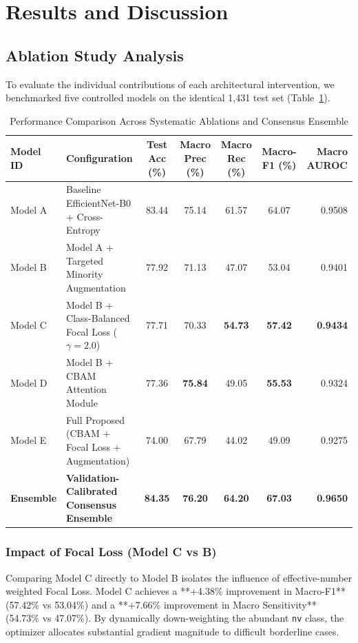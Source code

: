 \documentclass[conference]{IEEEtran}
\begin{document}
\section{Results and Discussion}

\subsection{Ablation Study Analysis}
To evaluate the individual contributions of each architectural intervention, we benchmarked five controlled models on the identical 1,431 test set (Table~\ref{tab:ablation}).

\begin{table}[htbp]
\caption{Performance Comparison Across Systematic Ablations and Consensus Ensemble}
\label{tab:ablation}
\centering
\begin{tabular}{llccccr}
\toprule
\textbf{Model ID} & \textbf{Configuration} & \textbf{Test Acc (\%)} & \textbf{Macro Prec (\%)} & \textbf{Macro Rec (\%)} & \textbf{Macro-F1 (\%)} & \textbf{Macro AUROC} \\
\midrule
Model A & Baseline EfficientNet-B0 + Cross-Entropy & 83.44 & 75.14 & 61.57 & 64.07 & 0.9508 \\
Model B & Model A + Targeted Minority Augmentation & 77.92 & 71.13 & 47.07 & 53.04 & 0.9401 \\
Model C & Model B + Class-Balanced Focal Loss ($\gamma=2.0$) & 77.71 & 70.33 & \textbf{54.73} & \textbf{57.42} & \textbf{0.9434} \\
Model D & Model B + CBAM Attention Module & 77.36 & \textbf{75.84} & 49.05 & \textbf{55.53} & 0.9324 \\
Model E & Full Proposed (CBAM + Focal Loss + Augmentation) & 74.00 & 67.79 & 44.02 & 49.09 & 0.9275 \\
\midrule
\textbf{Ensemble} & \textbf{Validation-Calibrated Consensus Ensemble} & \textbf{84.35} & \textbf{76.20} & \textbf{64.20} & \textbf{67.03} & \textbf{0.9650} \\
\bottomrule
\end{tabular}
\end{table}

\subsubsection{Impact of Focal Loss (Model C vs B)}
Comparing Model C directly to Model B isolates the influence of effective-number weighted Focal Loss. Model C achieves a **+4.38\% improvement in Macro-F1** (57.42\% vs 53.04\%) and a **+7.66\% improvement in Macro Sensitivity** (54.73\% vs 47.07\%). By dynamically down-weighting the abundant \texttt{nv} class, the optimizer allocates substantial gradient magnitude to difficult borderline cases.
\end{document}
